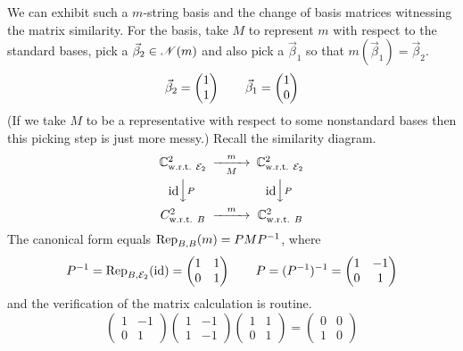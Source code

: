 \begin{example}
We can exhibit such a $m$-string basis 
and the change of basis matrices witnessing the matrix similarity.
For the basis,
take \( M \) to represent $m$ with respect to the standard bases,
pick a \( \vec{\beta}_2\in\nullspace{m} \)
and also pick a \( \vec{\beta}_1 \) 
so that \( m(\vec{\beta}_1)=\vec{\beta}_2 \).
\begin{equation*}
  \vec{\beta}_2=\colvec{1 \\ 1}
  \qquad
  \vec{\beta}_1=\colvec{1 \\ 0}
\end{equation*}
(If we take $M$ to be a representative with respect to some nonstandard bases
then this picking step is just more messy.)
Recall the similarity diagram.
\begin{equation*}
  \begin{CD}
    \C^2_\wrt{\stdbasis_2}      @>m>M>        \C^2_\wrt{\stdbasis_2}     \\
    @V\scriptstyle\identity V\scriptstyle PV  @V\scriptstyle\identity V\scriptstyle PV \\
    C^2_\wrt{B}                 @>m>>         \C^2_\wrt{B}
  \end{CD}
\end{equation*}
The canonical form equals \( \rep{m}{B,B}=PMP^{-1} \), where
\begin{equation*}
   P^{-1} %
         =\rep{\identity}{B,\stdbasis_2}
         =\begin{pmatrix}
            1  &1  \\
            0  &1
          \end{pmatrix}
   \qquad
   P=(P^{-1})^{-1}
         =\begin{pmatrix}
            1  &-1  \\
            0  &1
          \end{pmatrix}
\end{equation*}
and the verification of the matrix calculation is routine.
\begin{equation*}
  \begin{pmatrix}
    1  &-1  \\
    0  &1
  \end{pmatrix}
  \begin{pmatrix}
    1  &-1  \\
    1  &-1
  \end{pmatrix}
  \begin{pmatrix}
    1  &1  \\
    0  &1
  \end{pmatrix}=
  \begin{pmatrix}
    0  &0  \\
    1  &0
  \end{pmatrix}
\end{equation*}
\end{example}

